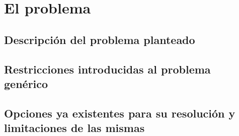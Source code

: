 \chapter{El problema}
\section{Descripción del problema planteado}
\section{Restricciones introducidas al problema genérico}
\section{Opciones ya existentes para su resolución y limitaciones de las mismas}

